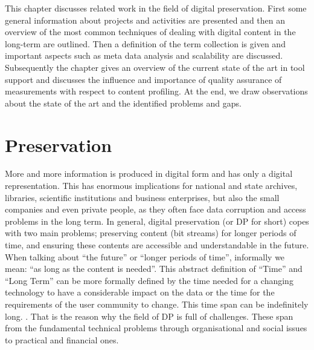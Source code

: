 This chapter discusses related work in the field of digital preservation.
First some general information about projects and activities are presented and then an overview of the most common techniques of dealing with digital content in the long-term are outlined.
Then a definition of the term collection is given and important aspects such as meta data analysis and scalability are discussed.
Subsequently the chapter gives an overview of the current state of the art in tool support and discusses the influence and importance of quality assurance of measurements with respect to content profiling.
At the end, we draw observations about the state of the art and the identified problems and gaps.

\section{Preservation}
More and more information is produced in digital form and has only a digital representation.
This has enormous implications for national and state archives, libraries, scientific institutions and business enterprises, but also the small companies and even private people, as they often face data corruption and access problems in the long term.
In general, digital preservation (or DP for short) copes with two main problems; preserving content (bit streams) for longer periods of time, and ensuring these contents are accessible and understandable in the future.
When talking about ``the future'' or ``longer periods of time'', informally we mean: ``as long as the content is needed''. This abstract definition of ``Time'' and ``Long Term'' can be more formally defined by the time needed for a changing technology to have a considerable impact on the data or the time for the requirements of the user community to change. This time span can be indefinitely long. \cite{citeulike:1971545}.
That is the reason why the field of DP is full of challenges. These span from the fundamental technical problems through organisational and social issues to practical and financial ones.

